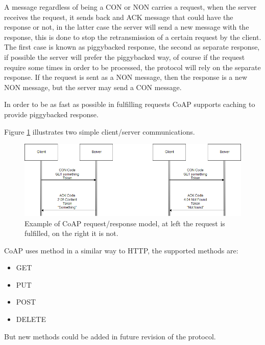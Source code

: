 	A message regardless of being a CON or NON carries a request, when the server receives the request, it sends back and ACK message that could have the response or not, in the latter case the server will
	send a new message with the response, this is done to stop the retransmission of a certain request by the client.\newline
	The first case is known as piggybacked response, the second as separate response, if possible the server will prefer the piggybacked way, of course if the request require some times in order to be processed, the protocol will rely on the separate response.\newline
	If the request is sent as a NON message, then the response is a new NON message, but the server may send a CON message.\newline
	
	In order to be as fast as possible in fulfilling requests CoAP supports caching to provide piggybacked response.\newline
	
	Figure \ref{fig:coap0} illustrates two simple client/server communications.
	
	\begin{figure}
		\includegraphics[width=\linewidth]{coap-img0.png}
		\caption{Example of CoAP request/response model, at left the request is fulfilled, on the right it is not.}
		\label{fig:coap0}
	\end{figure}

	CoAP uses method in a similar way to HTTP, the supported methods are: \newline
	\begin{itemize}
		\item GET
		\item PUT
		\item POST
		\item DELETE
	\end{itemize}
	But new methods could be added in future revision of the protocol.\newline

